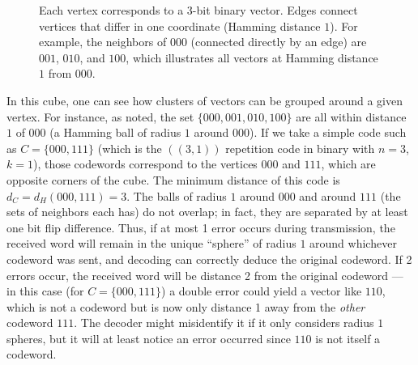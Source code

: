 \documentclass[docmute]{article}
\begin{document}
\begin{figure}[h]
\centering
{}
\caption{Each vertex corresponds to a 3-bit binary vector. Edges connect vertices that differ in one coordinate (Hamming distance $1$). For example, the neighbors of $000$ (connected directly by an edge) are $001$, $010$, and $100$, which illustrates all vectors at Hamming distance $1$ from $000$.}
\end{figure}

In this cube, one can see how clusters of vectors can be grouped around a given vertex. For instance, as noted, the set $\{000,001,010,100\}$ are all within distance $1$ of $000$ (a Hamming ball of radius $1$ around $000$). If we take a simple code such as $C=\{000,111\}$ (which is the $((3,1))$ repetition code in binary with $n=3$, $k=1$), those codewords correspond to the vertices $000$ and $111$, which are opposite corners of the cube. The minimum distance of this code is $d_C = d_H(000,111) = 3$. The balls of radius $1$ around $000$ and around $111$ (the sets of neighbors each has) do not overlap; in fact, they are separated by at least one bit flip difference. Thus, if at most 1 error occurs during transmission, the received word will remain in the unique “sphere” of radius $1$ around whichever codeword was sent, and decoding can correctly deduce the original codeword. If 2 errors occur, the received word will be distance 2 from the original codeword --- in this case (for $C=\{000,111\}$) a double error could yield a vector like $110$, which is not a codeword but is now only distance 1 away from the \emph{other} codeword $111$. The decoder might misidentify it if it only considers radius $1$ spheres, but it will at least notice an error occurred since $110$ is not itself a codeword.
\end{document}
